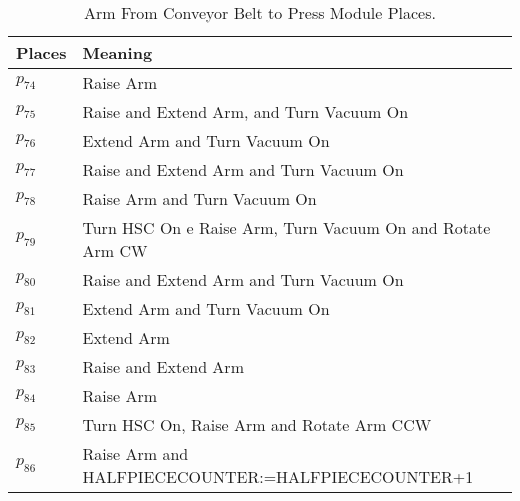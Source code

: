 \begin{table}[H]
\caption{Arm From Conveyor Belt to Press Module Places.}
\centering
\begin{tabular}{M{5cm}M{10cm}}
Places & Meaning\\
\hline
\hyperlink{partialNet:p741}{\hypertarget{partialTable:p74}{$p_{74}$}} & Raise Arm\\
\hyperlink{partialNet:p751}{\hypertarget{partialTable:p75}{$p_{75}$}} & Raise and Extend Arm, and Turn Vacuum On\\
\hyperlink{partialNet:p761}{\hypertarget{partialTable:p76}{$p_{76}$}} & Extend Arm and Turn Vacuum On\\
\hyperlink{partialNet:p771}{\hypertarget{partialTable:p77}{$p_{77}$}} & Raise and Extend Arm and Turn Vacuum On\\
\hyperlink{partialNet:p781}{\hypertarget{partialTable:p78}{$p_{78}$}} & Raise Arm and Turn Vacuum On\\
\hyperlink{partialNet:p791}{\hypertarget{partialTable:p79}{$p_{79}$}} & Turn HSC On e Raise Arm, Turn Vacuum On and  Rotate Arm CW\\
\hyperlink{partialNet:p801}{\hypertarget{partialTable:p80}{$p_{80}$}} & Raise and Extend Arm and Turn Vacuum On\\
\hyperlink{partialNet:p811}{\hypertarget{partialTable:p81}{$p_{81}$}} & Extend Arm and  Turn Vacuum On\\
\hyperlink{partialNet:p821}{\hypertarget{partialTable:p82}{$p_{82}$}} & Extend Arm\\
\hyperlink{partialNet:p831}{\hypertarget{partialTable:p83}{$p_{83}$}} & Raise and Extend Arm\\
\hyperlink{partialNet:p841}{\hypertarget{partialTable:p84}{$p_{84}$}} & Raise Arm\\
\hyperlink{partialNet:p851}{\hypertarget{partialTable:p85}{$p_{85}$}} & Turn HSC On, Raise Arm and Rotate Arm CCW\\
\hyperlink{partialNet:p861}{\hypertarget{partialTable:p86}{$p_{86}$}} & Raise Arm and HALFPIECECOUNTER:=HALFPIECECOUNTER+1\\
\end{tabular}
\end{table}
